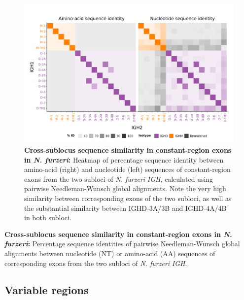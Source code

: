 	\begin{figure}
	\centering
	\includegraphics[width = \textwidth]{_Figures/png/nfu-ch-aln}
	\caption[Cross-sublocus sequence similarity in constant-region exons in \textit{N. furzeri} \textit{IGH}]{\textbf{Cross-sublocus sequence similarity in constant-region exons in \textit{N. furzeri}:} Heatmap of percentage sequence identity between amino-acid (right) and nucleotide (left) sequences of constant-region exons from the two subloci of \textit{N. furzeri} \textit{IGH}, calculated using pairwise Needleman-Wunsch global alignments. Note the very high similarity between corresponding exons of the two subloci, as well as the substantial similarity between IGHD-3A/3B and IGHD-4A/4B in both subloci.}
	\label{fig:nfu-ch-aln}
	\end{figure}
	
	\begin{table}\centering
		\caption[Cross-sublocus sequence similarity between corresponding constant-region exons in \textit{N. furzeri} \textit{IGH}]{\textbf{Cross-sublocus sequence similarity in constant-region exons in \textit{N. furzeri}:} Percentage sequence identities of pairwise Needleman-Wunsch global alignments between nucleotide (NT) or amino-acid (AA) sequences of corresponding exons from the two subloci of \textit{N. furzeri} \textit{IGH}.}
	
	\label{tab:nfu-ch-aln}
	\end{table}
	




	\subsection{Variable regions}
	\label{sec:nfu-locus-variable}
	
